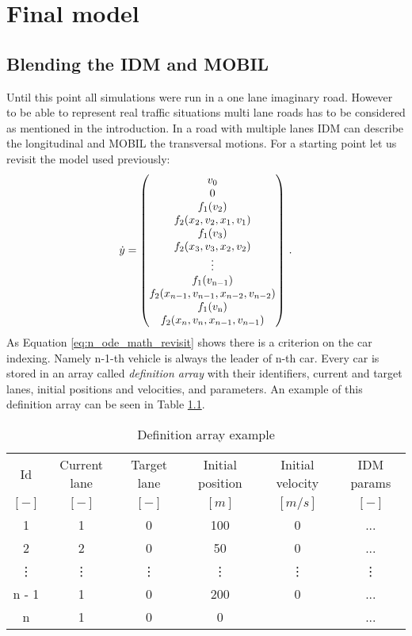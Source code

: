 \chapter{Final model}
	\section{Blending the IDM and MOBIL}
		Until this point all simulations were run in a one lane imaginary road. However to be able to represent real traffic situations multi lane roads has to be considered as mentioned in the introduction. In a road with multiple lanes IDM can describe the longitudinal and MOBIL the transversal motions. For a starting point let us revisit the model used previously:
		\begin{equation}
			\dot{y}=
			\begin{pmatrix}
			v_0\\
			0\\
			f_1(v_{2})\\
			f_2(x_{2}, v_{2},x_{1}, v_{1})\\
			f_1(v_{3})\\
			f_2(x_{3}, v_{3},x_{2}, v_{2})\\
			\vdots\\
			f_1(v_{\rm n-1})\\
			f_2(x_{n-1}, v_{n-1},x_{n-2}, v_{n-2})\\
			f_1(v_{\rm n})\\
			f_2(x_{n}, v_{n},x_{n-1}, v_{n-1})
			\end{pmatrix}\,.
			\label{eq:n_ode_math_revisit}
		\end{equation}
		As Equation \ref{eq:n_ode_math_revisit} shows there is a criterion on the car indexing.  Namely n-1-th vehicle is always the leader of n-th car. Every car is stored in an array called \textit{definition array} with their identifiers,  current and target lanes, initial positions and velocities, and parameters. An example of this definition array can be seen in Table \ref{tab:definition_array}.
		\begin{table}
			\begin{center}
				\begin{tabular}{ |c|c|c|c|c|c| }
					\hline
					Id & Current lane & Target lane & Initial position & Initial velocity& IDM params\\
					$[-]$ & $[-]$ & $[-]$ & $[m]$ & $[m/s]$ & $[-]$\\
					\hline
					1 & 1 & 0 & 100 & 0 & ...\\
					2 & 2 & 0 & 50 & 0 & ...\\
					\vdots & \vdots & \vdots & \vdots & \vdots & \vdots\\
					n - 1 & 1 & 0 & 200 & 0 & ...\\
					n & 1 & 0 & 0 &  & ...\\
					\hline
				\end{tabular}
			\end{center}
			\caption{Definition array example}
			\label{tab:definition_array}
		\end{table}
